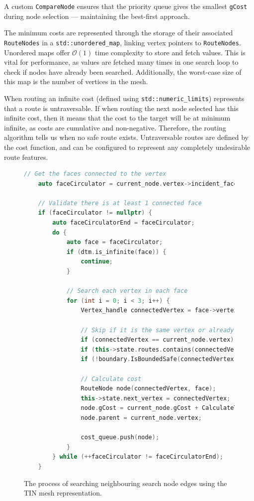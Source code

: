 \documentclass[12pt]{article}
\begin{document}
A custom \texttt{CompareNode} ensures that the priority queue gives the smallest \texttt{gCost} during node selection --- maintaining the best-first approach.

The minimum costs are represented through the storage of their associated \texttt{RouteNodes} in a \texttt{std::unordered\_map}, linking vertex pointers to \texttt{RouteNodes}. Unordered maps offer $\mathcal{O} (1)$ time complexity to store and fetch values. This is vital for performance, as values are fetched many times in one search loop to check if nodes have already been searched. Additionally, the worst-case size of this map is the number of vertices in the mesh.

When routing an infinite cost (defined using \texttt{std::numeric\_limits}) represents that a route is untraversable. If when routing the next node selected has this infinite cost, then it means that the cost to the target will be at minimum infinite, as costs are cumulative and non-negative. Therefore, the routing algorithm tells us when no safe route exists. Untraversable routes are defined by the cost function, and can be configured to represent any completely undesirable route features.

\begin{figure}[H]
  \centering
  \begin{lstlisting}[language=c++]
	// Get the faces connected to the vertex
	auto faceCirculator = current_node.vertex->incident_faces();

	// Validate there is at least 1 connected face
	if (faceCirculator != nullptr) {
		auto faceCirculatorEnd = faceCirculator;
		do {
			auto face = faceCirculator;
			if (dtm.is_infinite(face)) {
				continue;
			}

			// Search each vertex in each face
			for (int i = 0; i < 3; i++) {
				Vertex_handle connectedVertex = face->vertex(i);

				// Skip if it is the same vertex or already visited or out-of-bounds
				if (connectedVertex == current_node.vertex) { continue; }
				if (this->state.routes.contains(connectedVertex)) { continue; }
				if (!boundary.IsBoundedSafe(connectedVertex->point())) { continue; }

				// Calculate cost
				RouteNode node(connectedVertex, face);
				this->state.next_vertex = connectedVertex;
				node.gCost = current_node.gCost + CalculateTrivialCost(fm, this->state);
				node.parent = current_node.vertex;

				cost_queue.push(node);
			}
		} while (++faceCirculator != faceCirculatorEnd);
	}
  \end{lstlisting}
  \vspace{-2em}
  \caption{The process of searching neighbouring search node edges using the TIN mesh representation.}
  \label{fig:impl:search:edges}
\end{figure}
\end{document}
